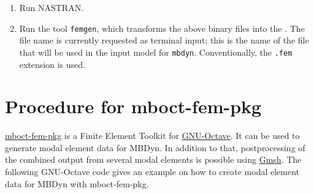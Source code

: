 \begin{enumerate}
\item Run NASTRAN.


\item Run the tool \texttt{femgen}, which transforms the above binary files
into the .
The file name is currently requested as terminal input; this is the name 
of the file that will be used in the input model for \texttt{mbdyn}.
Conventionally, the \texttt{.fem} extension is used.

\end{enumerate} %

\section{Procedure for mboct-fem-pkg}
\label{sec:APP:EL:STRUCT:JOINT:MODAL:MBOCTFEMPKG}
\href{https://github.com/octave-user/mboct-fem-pkg}{mboct-fem-pkg} is a Finite Element Toolkit for \href{https://gnu.org/software/octave}{GNU-Octave}. It can be used to generate modal element data for MBDyn. In addition to that, postprocessing of the combined output from several modal elements is possible using \href{http://www.gmsh.info/}{Gmsh}. The following GNU-Octave code gives an example on how to create modal element data for MBDyn with mboct-fem-pkg.

